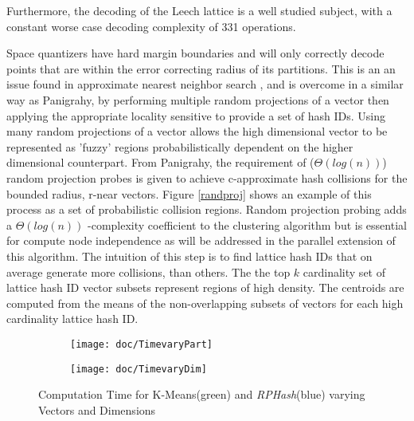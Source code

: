 \documentclass[a4paper,10pt]{article}
\begin{document}
Furthermore, the decoding of the Leech lattice is a well studied subject,
with a constant worse case decoding complexity of 331 operations\cite{Vardy95}.

Space quantizers have hard margin boundaries and will only correctly
decode points that are within the error correcting radius of its
partitions.  This is an an issue found in approximate nearest neighbor
search \cite{panigrahy,Andoni}, and is overcome in a similar way as
Panigrahy\cite{panigrahy}, by performing multiple random projections
of a vector then applying the appropriate locality sensitive to
provide a set of hash IDs.  Using many random projections of a vector
allows the high dimensional vector to be represented as 'fuzzy' regions
probabilistically dependent on the higher dimensional counterpart.  From
Panigrahy\cite{panigrahy}, the requirement of ($\Theta(log(n))$) random
projection probes is given to achieve c-approximate hash collisions for the
bounded radius, r-near vectors.  Figure \ref{randproj} shows an example of
this process as a set of probabilistic collision regions.  Random projection
probing adds a $\Theta(log(n))$ -complexity coefficient to the clustering
algorithm but is essential for compute node independence as will be addressed
in the parallel extension of this algorithm.  The intuition of this step is to
find lattice hash IDs that on average generate more collisions, than others.
The the top $k$ cardinality set of lattice hash ID vector subsets represent
regions of high density.  The centroids are computed from the means of the
non-overlapping subsets of vectors for each high cardinality lattice hash ID.

\begin{figure}
        \centering
        \begin{subfigure}[b]{0.49\textwidth}
                \texttt{[image: doc/TimevaryPart]}
                \label{TimePart}
        \end{subfigure}
        \begin{subfigure}[b]{0.49\textwidth}
                \texttt{[image: doc/TimevaryDim]}
                \label{TimeDim}
        \end{subfigure}
	  \caption{Computation Time for K-Means(green) and \emph{RPHash}(blue) 
               varying Vectors and Dimensions}\label{timecomplex}
\end{figure}
\end{document}
